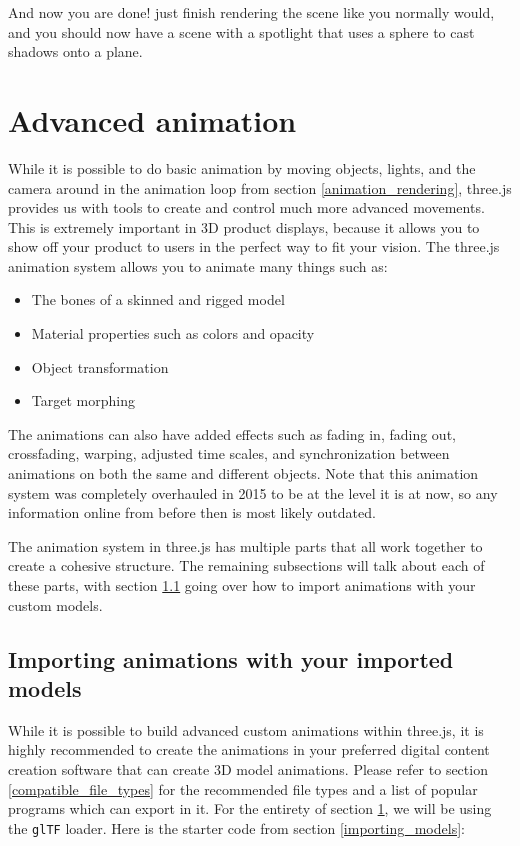 \documentclass[10pt,final,journal,compsoc]{IEEEtran}
\begin{document}
        And now you are done! just finish rendering the scene like you normally would, and you should now have a scene with a spotlight that uses a sphere to cast shadows onto a plane.



\section{Advanced animation} \label{advanced_animation}
    While it is possible to do basic animation by moving objects, lights, and the camera around in the animation loop from section \ref{animation_rendering}, three.js provides us with tools to create and control much more advanced movements. This is extremely important in 3D product displays, because it allows you to show off your product to users in the perfect way to fit your vision. The three.js animation system allows you to animate many things such as:
    
    \begin{itemize}
        \item The bones of a skinned and rigged model
        \item Material properties such as colors and opacity
        \item Object transformation
        \item Target morphing
    \end{itemize}
    
    The animations can also have added effects such as fading in, fading out, crossfading, warping, adjusted time scales, and synchronization between animations on both the same and different objects. Note that this animation system was completely overhauled in 2015 to be at the level it is at now, so any information online from before then is most likely outdated.
    
    The animation system in three.js has multiple parts that all work together to create a cohesive structure. The remaining subsections will talk about each of these parts, with section \ref{animation_imported} going over how to import animations with your custom models.
    
    \subsection{Importing animations with your imported models} \label{animation_imported}
    While it is possible to build advanced custom animations within three.js, it is highly recommended to create the animations in your preferred digital content creation software that can create 3D model animations. Please refer to section \ref{compatible_file_types} for the recommended file types and a list of popular programs which can export in it. For the entirety of section \ref{advanced_animation}, we will be using the \verb|glTF| loader. Here is the starter code from section \ref{importing_models}:
    
\end{document}
